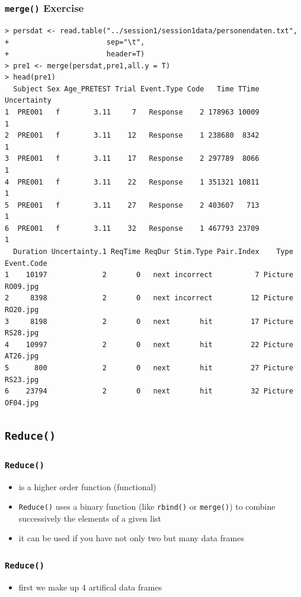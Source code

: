 \documentclass[xcolor={table},c]{beamer}
\begin{document}
\begin{frame}[fragile]\frametitle{\texttt{merge()} Exercise}\tiny
\begin{verbatim}
> persdat <- read.table("../session1/session1data/personendaten.txt",
+                       sep="\t",
+                       header=T)
> pre1 <- merge(persdat,pre1,all.y = T)
> head(pre1)
  Subject Sex Age_PRETEST Trial Event.Type Code   Time TTime Uncertainty
1  PRE001   f        3.11     7   Response    2 178963 10009           1
2  PRE001   f        3.11    12   Response    1 238680  8342           1
3  PRE001   f        3.11    17   Response    2 297789  8066           1
4  PRE001   f        3.11    22   Response    1 351321 10811           1
5  PRE001   f        3.11    27   Response    2 403607   713           1
6  PRE001   f        3.11    32   Response    1 467793 23709           1
  Duration Uncertainty.1 ReqTime ReqDur Stim.Type Pair.Index    Type Event.Code
1    10197             2       0   next incorrect          7 Picture   RO09.jpg
2     8398             2       0   next incorrect         12 Picture   RO20.jpg
3     8198             2       0   next       hit         17 Picture   RS28.jpg
4    10997             2       0   next       hit         22 Picture   AT26.jpg
5      800             2       0   next       hit         27 Picture   RS23.jpg
6    23794             2       0   next       hit         32 Picture   OF04.jpg
\end{verbatim}
\end{frame}



\subsection{\texttt{Reduce()}}
\begin{frame}[fragile]\frametitle{\texttt{Reduce()}}
\begin{itemize}
\item is a higher order function (functional)
\item \texttt{Reduce()} uses a binary function (like \texttt{rbind()} or \texttt{merge()}) to combine successively the elements of a given list
\item it can be used if you have not only two but many data frames
\end{itemize}
\end{frame}


\begin{frame}[fragile]\frametitle{\texttt{Reduce()}}
  \begin{itemize}
  \item first we make up 4 artifical data frames
  \end{itemize}
\end{frame}
\end{document}

